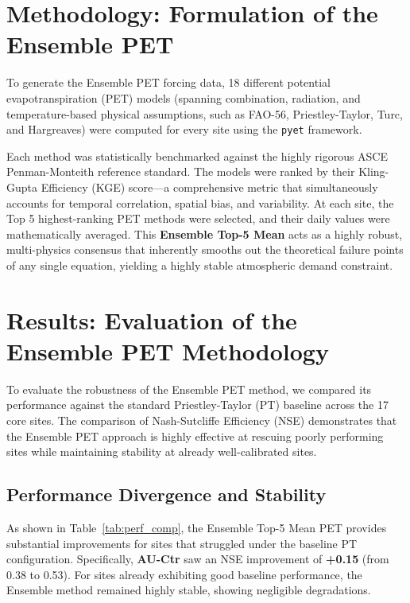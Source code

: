 \documentclass[11pt,a4paper]{article}
\begin{document}
\section{Methodology: Formulation of the Ensemble PET}
To generate the Ensemble PET forcing data, 18 different potential evapotranspiration (PET) models (spanning combination, radiation, and temperature-based physical assumptions, such as FAO-56, Priestley-Taylor, Turc, and Hargreaves) were computed for every site using the \texttt{pyet} framework. 

Each method was statistically benchmarked against the highly rigorous ASCE Penman-Monteith reference standard. The models were ranked by their Kling-Gupta Efficiency (KGE) score---a comprehensive metric that simultaneously accounts for temporal correlation, spatial bias, and variability. At each site, the Top 5 highest-ranking PET methods were selected, and their daily values were mathematically averaged. This \textbf{Ensemble Top-5 Mean} acts as a highly robust, multi-physics consensus that inherently smooths out the theoretical failure points of any single equation, yielding a highly stable atmospheric demand constraint.

\section{Results: Evaluation of the Ensemble PET Methodology}
To evaluate the robustness of the Ensemble PET method, we compared its performance against the standard Priestley-Taylor (PT) baseline across the 17 core sites. The comparison of Nash-Sutcliffe Efficiency (NSE) demonstrates that the Ensemble PET approach is highly effective at rescuing poorly performing sites while maintaining stability at already well-calibrated sites.

\subsection{Performance Divergence and Stability}
As shown in Table~\ref{tab:perf_comp}, the Ensemble Top-5 Mean PET provides substantial improvements for sites that struggled under the baseline PT configuration. Specifically, \textbf{AU-Ctr} saw an NSE improvement of \textbf{+0.15} (from 0.38 to 0.53). For sites already exhibiting good baseline performance, the Ensemble method remained highly stable, showing negligible degradations.
\end{document}
